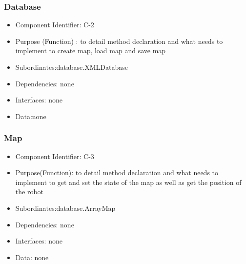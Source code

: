 \documentclass[11pt, a4paper]{report}
\begin{document}

\subsubsection{Database}
\begin{itemize}
\item Component Identifier: C-2
\item Purpose (Function) : to detail method declaration and
what needs to implement to create map, load map and save map
\item Subordinates:database.XMLDatabase
\item Dependencies: none
\item Interfaces: none
\item Data:none
\end{itemize}


\subsubsection{Map}
\begin{itemize}
\item Component Identifier:  C-3
\item Purpose(Function): to detail method declaration and what needs to implement
to get and set the state of the map as well as get the position of the robot
\item Subordinates:database.ArrayMap
\item Dependencies: none
\item Interfaces: none
\item Data: none
\end{itemize}
\end{document}
